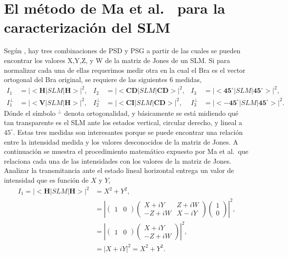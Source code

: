 \section{El método de Ma et al.~ para la caracterización del SLM}
\label{sec:metodo_ma}
Según , hay tres combinaciones de PSD y PSG a partir
de las cuales se pueden encontrar los valores X,Y,Z, y W de la matriz
de Jones de un SLM. Si para
normalizar cada una de ellas requerimos medir otra en la cual el Bra
es el vector ortogonal del Bra original, se requiere de las siguientes
6 medidas, 
\begin{align*}
I_1 &= |<\mathbf{H}|SLM|\mathbf{H}>|^2,& I_2 &= |<\mathbf{CD}|SLM|\mathbf{CD}>|^2,&I_3
  &= |<\mathbf{45^{\circ}}|SLM|\mathbf{45^{\circ}}>|^2,\\
I_1^{\perp} &= |<\mathbf{V}|SLM|\mathbf{H}>|^2,&I_2^{\perp} &= |<\mathbf{CI}|SLM|\mathbf{CD}>|^2,&I_{3}^{\perp} &= |<\mathbf{-45^{\circ}}|SLM|\mathbf{45^{\circ}}>|^2.
\end{align*}
Dónde el símbolo $^{\perp}$ denota ortogonalidad, y básicamente se
está midiendo qué tan transparente es el SLM ante 
los estados vertical, circular derecho, y lineal a $45^{\circ}$. 
Estas tres medidas son interesantes porque se puede encontrar una
relación entre la intensidad medida 
y los valores desconocidos de la matriz de Jones. 
A continuación se muestra el procedimiento matemático expuesto por Ma
et al.~que relaciona cada una de las intensidades con los valores de
la matriz de Jones. 
Analizar la transmitancia ante el estado lineal horizontal entrega un valor
de intensidad que es función de $X$ y $Y$,
\begin{align*}
I_1 = |<\mathbf{H}|SLM|\mathbf{H}>|^2 &= X^2+Y^2,\\
&=  \left|\begin{pmatrix} 1&0\end{pmatrix} 
       \begin{pmatrix}
         X+iY & Z+iW \\-Z+iW & X-iY
       \end{pmatrix} \begin{pmatrix}1\\0\end{pmatrix}\right|^2, \\
&=  \left|\begin{pmatrix} 1&0\end{pmatrix} 
       \begin{pmatrix} X+iY \\-Z+iW \end{pmatrix} \right|^2, \\
&=  \left|X+iY\right|^2 =  X^2+Y^2.\\
\end{align*}

